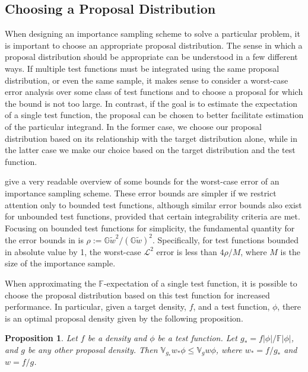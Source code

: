 \documentclass[11pt, oneside]{article}   	%
\newcommand{\bF}{\mathbb{F}}
\newcommand{\bG}{\mathbb{G}}
\newcommand{\bV}{\mathbb{V}}
\newtheorem{proposition}{Proposition}[section]
\begin{document}
\subsection{Choosing a Proposal Distribution}

When designing an importance sampling scheme to solve a particular problem, it is important to choose an appropriate proposal distribution. The sense in which a proposal distribution should be appropriate can be understood in a few different ways. If multiple test functions must be integrated using the same proposal distribution, or even the same sample, it makes sense to consider a worst-case error analysis over some class of test functions and to choose a proposal for which the bound is not too large. In contrast, if the goal is to estimate the expectation of a single test function, the proposal can be chosen to better facilitate estimation of the particular integrand. In the former case, we choose our proposal distribution based on its relationship with the target distribution alone, while in the latter case we make our choice based on the target distribution and the test function.

\citet{Aga17} give a very readable overview of some bounds for the worst-case error of an importance sampling scheme. These error bounds are simpler if we restrict attention only to bounded test functions, although similar error bounds also exist for unbounded test functions, provided that certain integrability criteria are met. Focusing on bounded test functions for simplicity, the fundamental quantity for the error bounds in \citeauthor{Aga17} is $\rho := \bG \tilde{w}^2 / (\bG \tilde{w})^2$. Specifically, for test functions bounded in absolute value by 1, the worst-case $\mathcal{L}^2$ error is less than $4 \rho / M$, where $M$ is the size of the importance sample. 

When approximating the $\bF$-expectation of a single test function, it is possible to choose the proposal distribution based on this test function for increased performance. In particular, given a target density, $f$, and a test function, $\phi$, there is an optimal proposal density given by the following proposition.
%
\begin{proposition}
    \label{thm:imp_samp}
    Let $f$ be a density and $\phi$ be a test function. Let $g_* = f |\phi| / \bF |\phi|$, and $g$ be any other proposal density. Then $\bV_{g_*} w_* \phi \leq \bV_g w \phi$, where $w_* = f/g_*$ and $w = f/g$.
\end{proposition}
\end{document}
